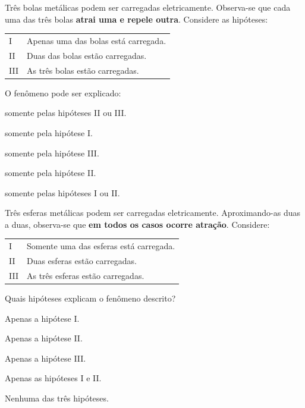 \begin{questao}[2]{}
Três bolas metálicas podem ser carregadas eletricamente. Observa-se que cada uma
das três bolas \textbf{atrai uma e repele outra}. Considere as hipóteses:

\smallskip
\begin{tabular}{@{}ll@{}}
I   & Apenas uma das bolas está carregada.\\
II  & Duas das bolas estão carregadas.\\
III & As três bolas estão carregadas.\\
\end{tabular}
\smallskip

O fenômeno pode ser explicado:
\begin{alternativas}
\item somente pelas hipóteses II ou III.
\item somente pela hipótese I.
\item somente pela hipótese III.
\item somente pela hipótese II.
\item somente pelas hipóteses I ou II.
\end{alternativas}
\end{questao}

\begin{questao}[2]{}
Três esferas metálicas podem ser carregadas eletricamente. Aproximando-as duas a
duas, observa-se que \textbf{em todos os casos ocorre atração}. Considere:

\smallskip
\begin{tabular}{@{}ll@{}}
I   & Somente uma das esferas está carregada.\\
II  & Duas esferas estão carregadas.\\
III & As três esferas estão carregadas.\\
\end{tabular}
\smallskip

Quais hipóteses explicam o fenômeno descrito?
\begin{alternativas}
\item Apenas a hipótese I.
\item Apenas a hipótese II.
\item Apenas a hipótese III.
\item Apenas as hipóteses I e II.
\item Nenhuma das três hipóteses.
\end{alternativas}
\end{questao}

